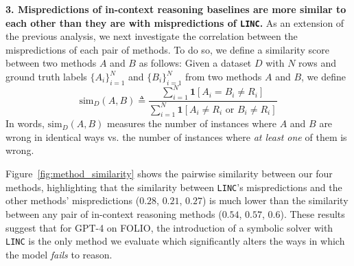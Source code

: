 \documentclass[11pt]{article}
\begin{document}
\textbf{3. Mispredictions of in-context reasoning baselines are more similar to each other than they are with mispredictions of \texttt{LINC}.} As an extension of the previous analysis, we next investigate the correlation between the mispredictions of each pair of methods.
To do so, we define a similarity score between two methods $A$ and $B$ as follows:
Given a dataset $D$ with $N$ rows and ground truth labels $\{A_i\}_{i=1}^N$ and $\{B_i\}_{i=1}^N$ from two methods $A$ and $B$, we define
$$\text{sim}_D(A, B) \triangleq \frac{\sum_{i=1}^N \mathbf{1}\left[ A_i = B_i \ne R_i \right] }{\sum_{i=1}^N \mathbf{1}\left[ A_i \ne R_i \text{ or } B_i \ne R_i\right]}$$
In words, $\text{sim}_D(A,B)$ measures the number of instances where $A$ and $B$ are wrong in identical ways vs. the number of instances where \emph{at least one} of them is wrong.

Figure~\ref{fig:method_similarity} shows the pairwise similarity between our four methods, highlighting that the similarity between \texttt{LINC}'s mispredictions and the other methods' mispredictions ($0.28$, $0.21$, $0.27$) is much lower than the similarity between any pair of in-context reasoning methods ($0.54$, $0.57$, $0.6$). 
These results suggest that for GPT-4 on FOLIO, the introduction of a symbolic solver with \texttt{LINC} is the only method we evaluate which significantly alters the ways in which the model \emph{fails} to reason. 


\end{document}
